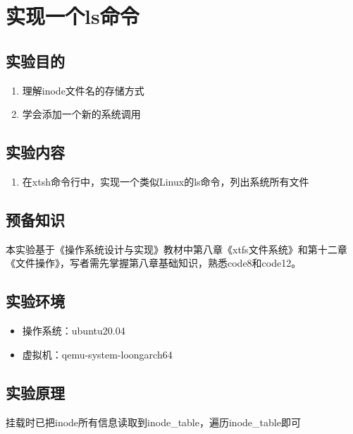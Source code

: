 \graphicspath{{lab36/pic/}}

\chapter{实现一个ls命令}

\section{实验目的}
\begin{enumerate}
	\item 理解inode文件名的存储方式
	\item 学会添加一个新的系统调用
\end{enumerate}

\section{实验内容}
    \begin{enumerate}
        \item 在xtsh命令行中，实现一个类似Linux的ls命令，列出系统所有文件
    \end{enumerate}
\section{预备知识}

本实验基于《操作系统设计与实现》教材中第八章《xtfs文件系统》和第十二章《文件操作》，写者需先掌握第八章基础知识，熟悉code8和code12。

\section{实验环境}

\begin{itemize}
	\item 操作系统：ubuntu20.04
	\item 虚拟机：qemu-system-loongarch64
\end{itemize}

\section{实验原理}
    \item 挂载时已把inode所有信息读取到inode\_table，遍历inode\_table即可

